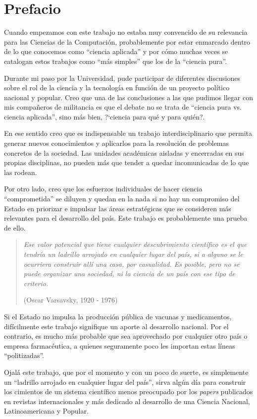 \chapter*{Prefacio}

Cuando empezamos con este trabajo no estaba muy convencido de su relevancia
para las Ciencias de la Computaci\'on, probablemente por estar enmarcado dentro
de lo que conocemos como ``ciencia aplicada'' y por c\'omo muchas veces se
catalogan estos trabajos como ``m\'as simples'' que los de la ``ciencia pura''.

Durante mi paso por la Universidad, pude participar de diferentes discusiones
sobre el rol de la ciencia y la tecnolog\'ia en funci\'on de un proyecto
pol\'itico nacional y popular. Creo que una de las conclusiones a las que
pudimos llegar con mis compa\~neros de militancia es que el debate no se trata
de ``ciencia pura vs. ciencia aplicada'', sino m\'as bien, ?`ciencia para qu\'e
y para qui\'en?.

En ese sentido creo que es indispensable un trabajo interdisciplinario que
permita generar nuevos conocimientos y aplicarlos para la resoluci\'on de
problemas concretos de la sociedad. Las unidades acad\'emicas aisladas y
encerradas en sus propias disciplinas, no pueden m\'as que tender a quedar
incomunicadas de lo que las rodean.

Por otro lado, creo que los esfuerzos individuales de hacer ciencia
``comprometida'' se diluyen y quedan en la nada si no hay un compromiso del
Estado en priorizar e impulsar las \'areas estrat\'egicas que se consideren
m\'as relevantes para el desarrollo del pa\'is. Este trabajo es probablemente
una prueba de ello.

\begin{quotation}
 \em Ese valor potencial que tiene cualquier descubrimiento cient\'ifico es el
que tendr\'ia un ladrillo arrojado en cualquier lugar del pa\'is, si a alguno se
le ocurriera construir all\'i una casa, por casualidad. Es posible, pero no se
puede organizar una sociedad, ni la ciencia de un pa\'is con ese tipo de
criterio.
\begin{flushright}
(Oscar Varsavsky, 1920 - 1976)
\end{flushright}
\end{quotation}

Si el Estado no impulsa la producci\'on p\'ublica de vacunas y medicamentos,
dif\'icilmente este trabajo signifique un aporte al desarrollo nacional. Por el
contrario, es mucho m\'as probable que sea aprovechado por cualquier otro pa\'is
o empresa farmac\'eutica, a quienes seguramente poco les importan estas l\'ineas
``politizadas''.

Ojal\'a este trabajo, que por el momento y con un poco de suerte, es simplemente
un ``ladrillo arrojado en cualquier lugar del pa\'is'', sirva alg\'un d\'ia para
construir los cimientos de un sistema cient\'ifico menos preocupado por los
\textit{papers} publicados en revistas internacionales y m\'as dedicado al
desarrollo de una Ciencia Nacional, Latinoamericana y Popular.
